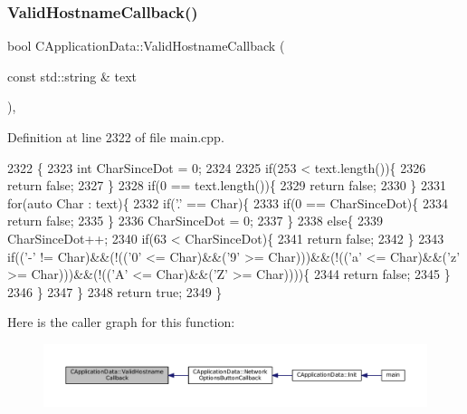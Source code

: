 \subsubsection{\texorpdfstring{Valid\+Hostname\+Callback()}{ValidHostnameCallback()}}
{\footnotesize\ttfamily bool C\+Application\+Data\+::\+Valid\+Hostname\+Callback (\begin{DoxyParamCaption}\item[{const std\+::string \&}]{text }\end{DoxyParamCaption})\hspace{0.3cm}{\ttfamily [static]}, {\ttfamily [protected]}}



Definition at line 2322 of file main.\+cpp.


\begin{DoxyCode}
2322                                                                  \{
2323     \textcolor{keywordtype}{int} CharSinceDot = 0;
2324 
2325     \textcolor{keywordflow}{if}(253 < text.length())\{
2326         \textcolor{keywordflow}{return} \textcolor{keyword}{false};    
2327     \}
2328     \textcolor{keywordflow}{if}(0 == text.length())\{
2329         \textcolor{keywordflow}{return} \textcolor{keyword}{false};
2330     \}
2331     \textcolor{keywordflow}{for}(\textcolor{keyword}{auto} Char : text)\{
2332         \textcolor{keywordflow}{if}(\textcolor{charliteral}{'.'} == Char)\{
2333             \textcolor{keywordflow}{if}(0 == CharSinceDot)\{
2334                 \textcolor{keywordflow}{return} \textcolor{keyword}{false};
2335             \}
2336             CharSinceDot = 0;
2337         \}
2338         \textcolor{keywordflow}{else}\{
2339             CharSinceDot++;
2340             \textcolor{keywordflow}{if}(63 < CharSinceDot)\{
2341                 \textcolor{keywordflow}{return} \textcolor{keyword}{false};   
2342             \}
2343             \textcolor{keywordflow}{if}((\textcolor{charliteral}{'-'} != Char)&&(!((\textcolor{charliteral}{'0'} <= Char)&&(\textcolor{charliteral}{'9'} >= Char)))&&(!((\textcolor{charliteral}{'a'} <= Char)&&(\textcolor{charliteral}{'z'} >= Char)))&&(!((\textcolor{charliteral}{'A'}
       <= Char)&&(\textcolor{charliteral}{'Z'} >= Char))))\{
2344                 \textcolor{keywordflow}{return} \textcolor{keyword}{false};
2345             \}
2346         \}
2347     \}
2348     \textcolor{keywordflow}{return} \textcolor{keyword}{true};
2349 \}
\end{DoxyCode}
Here is the caller graph for this function\+:
\nopagebreak
\begin{figure}[H]
\begin{center}
\leavevmode
\includegraphics[width=350pt]{classCApplicationData_aad04c7da1cc86bef623efda1019907fd_icgraph}
\end{center}
\end{figure}
